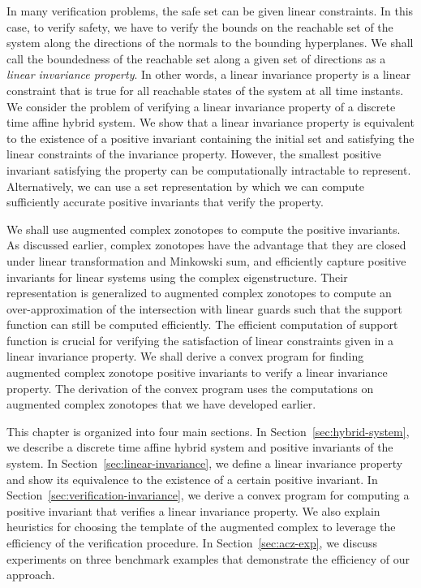 In many verification problems, the safe set can be given linear
constraints.  In this case, to verify safety, we have to verify the
bounds on the reachable set of the system along the directions of the
normals to the bounding hyperplanes.  We shall call the boundedness of
the reachable set along a given set of directions as a {\it linear
invariance property}.  In other words, a linear invariance property is
a linear constraint that is true for all reachable states of the
system at all time instants.  We consider the problem of verifying a
linear invariance property of a discrete time affine hybrid system.
We show that a linear invariance property is equivalent to the
existence of a positive invariant containing the initial set and
satisfying the linear constraints of the invariance property. However,
the smallest positive invariant satisfying the property can be
computationally intractable to represent.  Alternatively, we can use a
set representation by which we can compute sufficiently accurate
positive invariants that verify the property.


We shall use augmented complex zonotopes to compute the positive
invariants.  As discussed earlier, complex zonotopes have the
advantage that they are closed under linear transformation and
Minkowski sum, and efficiently capture positive invariants for linear
systems using the complex eigenstructure.  Their representation is
generalized to augmented complex zonotopes to compute an
over-approximation of the intersection with linear guards such that
the support function can still be computed efficiently.  The efficient
computation of support function is crucial for verifying the
satisfaction of linear constraints given in a linear invariance
property.  We shall derive a convex program  for finding augmented
complex zonotope positive invariants to verify a linear invariance
property.  The derivation of the convex program uses the computations
on augmented complex zonotopes that we have developed earlier.

 This chapter is
organized into four main sections.  In
Section~\ref{sec:hybrid-system}, we describe a discrete time affine
hybrid system and positive invariants of the system.  In
Section~\ref{sec:linear-invariance}, we define a linear invariance
property and show its equivalence to the existence of a certain
positive invariant.  In Section~\ref{sec:verification-invariance}, we
derive a convex program for computing a positive invariant that
verifies a linear invariance property.  We also explain heuristics for
choosing the template of the augmented complex to leverage the
efficiency of the verification procedure.  In Section~\ref{sec:acz-exp},
we discuss experiments on three benchmark examples that demonstrate
the efficiency of our approach.

